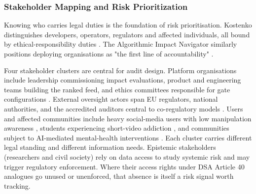 \documentclass[11pt]{article}
\begin{document}
\subsubsection{Stakeholder Mapping and Risk Prioritization}
\label{sec:stakeholder_mapping_risk_prioritization} Knowing who carries legal duties is the foundation of risk prioritisation. Kostenko distinguishes developers, operators, regulators and affected individuals, all bound by ethical-responsibility duties \parencites[61--62]{2977039}. The Algorithmic Impact Navigator similarly positions deploying organisations as "the first line of accountability" \parencites[2]{2742041}[3]{2742041}.

Four stakeholder clusters are central for audit design. Platform organisations include leadership commissioning impact evaluations, product and engineering teams building the ranked feed, and ethics committees responsible for gate configurations \parencites[2]{2742041}[61--62]{2977039}. External oversight actors span EU regulators, national authorities, and the accredited auditors central to co-regulatory models \parencites[10]{2977039}[2]{0375818}. Users and affected communities include heavy social-media users with low manipulation awareness \parencites[10]{9360054}, students experiencing short-video addiction \parencites[2]{8958037}, and communities subject to AI-mediated mental-health interventions \parencites[13]{5419804}. Each cluster carries different legal standing and different information needs. Epistemic stakeholders (researchers and civil society) rely on data access \parencites[21]{3195574} to study systemic risk and may trigger regulatory enforcement. Where their access rights under DSA Article 40 analogues go unused or unenforced, that absence is itself a risk signal worth tracking.
\end{document}
